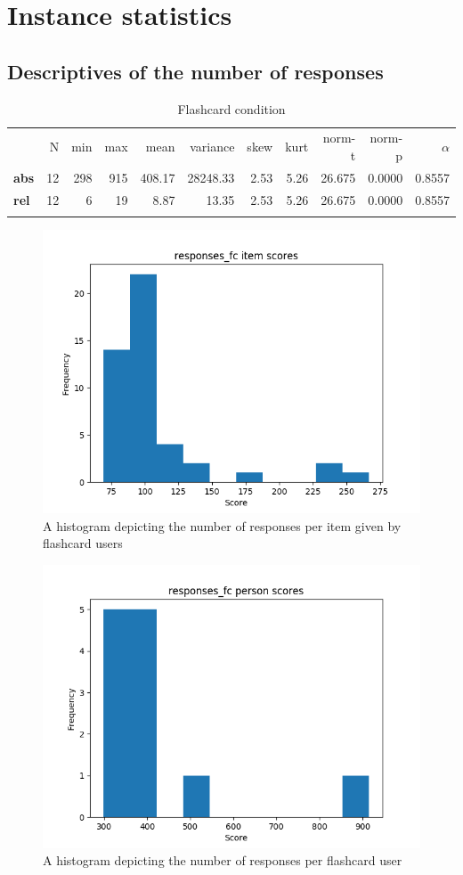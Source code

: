 \chapter{Instance statistics}
\label{app:instance_stats}

\FloatBarrier
\section{Descriptives of the number of responses}

\begin{longtable}[c]{@{}lrrrrrrrrrr@{}}
\caption{Flashcard condition}
\endfirsthead
\endhead
\toprule\addlinespace
& N & min & max & mean & variance & skew & kurt & norm-t &
norm-p & $\alpha$
\\\addlinespace
\midrule
\textbf{abs} & 12 & 298 & 915 & 408.17 & 28248.33 & 2.53 & 5.26 & 26.675
& 0.0000 & 0.8557
\\\addlinespace
\textbf{rel} & 12 & 6 & 19 & 8.87 & 13.35 & 2.53 & 5.26 & 26.675 &
0.0000 & 0.8557
\\\addlinespace
\bottomrule
    \label{tab:responses_fc}
\end{longtable}

\begin{figure}
    \centering
    \includegraphics[width=.7\textwidth]{img/responses_fc_diff.png}
    \caption{A histogram depicting the number of responses per item given by flashcard users}
    \label{fig:responses_fc_diff}
\end{figure}
\begin{figure}
    \centering
    \includegraphics[width=.7\textwidth]{img/responses_fc_abil.png}
    \caption{A histogram depicting the number of responses per flashcard user}
    \label{fig:responses_fc_abil}
\end{figure}

